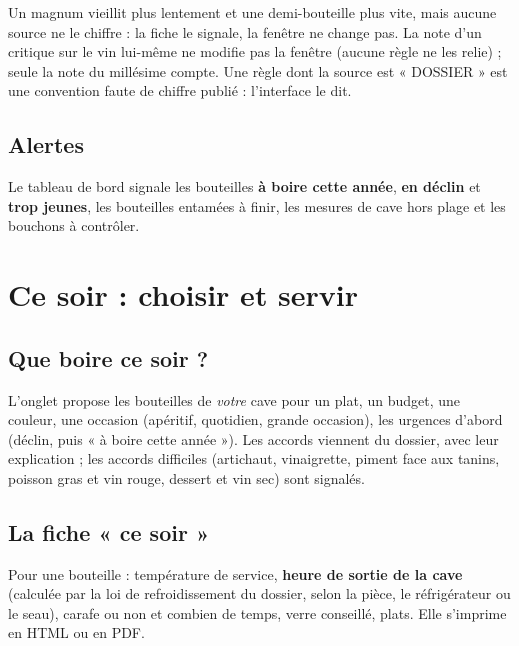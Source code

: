 \documentclass[11pt,a4paper]{article}
\begin{document}

\begin{sources}
Un magnum vieillit plus lentement et une demi-bouteille plus vite, mais aucune source ne le chiffre : la
fiche le signale, la fenêtre ne change pas. La note d'un critique sur le vin lui-même ne modifie pas la
fenêtre (aucune règle ne les relie) ; seule la note du millésime compte. Une règle dont la source est
« DOSSIER » est une convention faute de chiffre publié : l'interface le dit.
\end{sources}

\subsection{Alertes}
Le tableau de bord signale les bouteilles \textbf{à boire cette année}, \textbf{en déclin} et \textbf{trop
jeunes}, les bouteilles entamées à finir, les mesures de cave hors plage et les bouchons à contrôler.

\section{Ce soir : choisir et servir}
\subsection{Que boire ce soir ?}
L'onglet  propose les bouteilles de \emph{votre} cave pour un plat, un budget, une couleur,
une occasion (apéritif, quotidien, grande occasion), les urgences d'abord (déclin, puis « à boire cette
année »). Les accords viennent du dossier, avec leur explication ; les accords difficiles (artichaut,
vinaigrette, piment face aux tanins, poisson gras et vin rouge, dessert et vin sec) sont signalés.


\subsection{La fiche « ce soir »}
Pour une bouteille : température de service, \textbf{heure de sortie de la cave} (calculée par la loi de
refroidissement du dossier, selon la pièce, le réfrigérateur ou le seau), carafe ou non et combien de
temps, verre conseillé, plats. Elle s'imprime en HTML ou en PDF.
\end{document}
